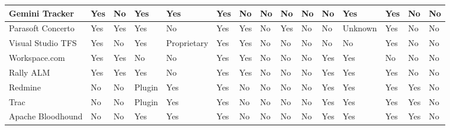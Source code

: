 \begin{landscape}
\begin{table}[!ht]
\begin{center}
\begin{tabular}{|l|l|l|l|l|l|l|l|l|l|l|l|l|l|l|}
    Gemini Tracker            & Yes             & No           & Yes            & Yes                         & Yes            & No      & No             & No           & No                      & No                          & Yes       & Yes                & No          & No           \\ \hline
    Parasoft Concerto         & Yes             & Yes          & Yes            & No                          & Yes            & Yes     & No             & Yes          & No                      & No                          & Unknown   & Yes                & No          & No           \\ \hline
    Visual Studio TFS         & Yes             & No           & Yes            & Proprietary                 & Yes            & Yes     & No             & No           & No                      & No                          & No        & Yes                & No          & No           \\ \hline
    Workspace.com             & Yes             & Yes          & No             & No                          & Yes            & Yes     & No             & No           & No                      & Yes                         & Yes       & No                 & No          & No           \\ \hline
    Rally ALM                 & Yes             & Yes          & Yes            & No                          & Yes            & Yes     & No             & No           & No                      & Yes                         & Yes       & Yes                & No          & No           \\ \hline
    Redmine                   & No              & No           & Plugin         & Yes                         & Yes            & No      & No             & No           & No                      & Yes                         & Yes       & Yes                & Yes         & No           \\ \hline
    Trac                      & No              & No           & Plugin         & Yes                         & Yes            & No      & No             & No           & No                      & Yes                         & Yes       & Yes                & Yes         & No           \\ \hline
    Apache Bloodhound         & No              & No           & Yes            & Yes                         & Yes            & No      & No             & No           & No                      & Yes                         & Yes       & Yes                & Yes         & No           \\ \hline

\end{tabular}
\end{center}
\end{table}
\end{landscape}
